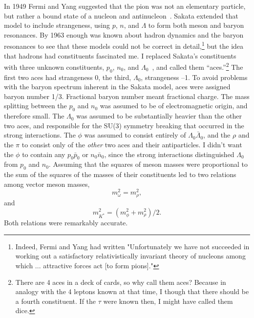 \documentclass[12pt]{article}
\begin{document}
In 1949 Fermi and Yang suggested that the pion was not an elementary particle, but rather a bound state of a nucleon and antinucleon~\cite{Fermi}. Sakata extended that model to include strangeness, using $p$, $n$, and $\Lambda$ to form both meson and baryon resonances. By 1963 enough was known about hadron dynamics and the baryon resonances to see that these models could not be correct in detail,\footnote {Indeed, Fermi and Yang had written "Unfortunately we have not succeeded in working out a satisfactory relativistically invariant theory of nucleons among which ... attractive forces act [to form pions]."} but the idea that hadrons had constituents fascinated me. I replaced Sakata's constituents with three unknown constituents, $p_{0}$, $n_{0}$, and $\Lambda_{0}$~\cite{GZaces1,GZaces2},
and called them ``aces.''\footnote{There are 4 aces in a deck of cards, so why call them aces? Because in analogy with the 4 leptons known at that time, I though that there should be a fourth constituent. If the $\tau$ were known then, I might have called them dice.}
The first two aces had strangeness 0, the third, $\Lambda_{0}$, strangeness --1. To avoid problems with the baryon spectrum inherent in the Sakata model, aces were assigned baryon number 1/3. Fractional baryon number meant fractional charge.  The mass splitting between the  $p_{0}$ and $n_{0}$ was assumed to be of electromagnetic origin, and therefore small. The $\Lambda_{0}$ was assumed to be substantially heavier than the other two aces, and responsible for the SU(3) symmetry breaking that occurred in the strong interactions.
The $\phi$ was assumed to consist entirely of $\Lambda_{0}\bar\Lambda_{0}$, and the $\rho$ and the $\pi$ to consist only of the {\it other} two aces and their antiparticles. I didn't want the $\phi$ to contain any $p_0\bar p_0$ or $n_0\bar n_0$, since the strong interactions distinguished $\Lambda_{0}$ from $p_0$ and $n_0$. Assuming that the squares of meson masses were proportional to the sum of the squares of the masses of their constituents led to two relations among vector meson masses,
$$
m_{\omega}^{2}=m_{\rho}^{2},
$$
\vskip -0.2in
and
\vskip -0.2in
$$
m_{K^{*}}^{2} =  ( m_{\phi}^{2}+ m_{\rho}^{2})/2.
$$
Both relations were remarkably accurate.
\end{document}
